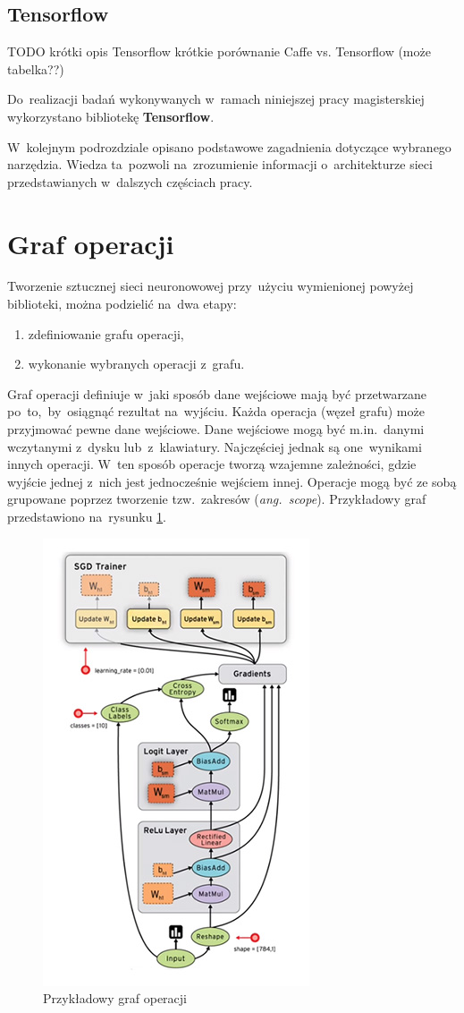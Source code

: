 \subsection{Tensorflow}
TODO krótki opis Tensorflow
krótkie porównanie Caffe vs. Tensorflow (może tabelka??)

Do~realizacji badań wykonywanych w~ramach niniejszej pracy magisterskiej wykorzystano bibliotekę
\textbf{Tensorflow}.

W~kolejnym podrozdziale opisano podstawowe zagadnienia dotyczące wybranego narzędzia. Wiedza ta~pozwoli na~zrozumienie
informacji o~architekturze sieci przedstawianych w~dalszych częściach pracy.

\section{Graf operacji}
Tworzenie sztucznej sieci neuronowowej przy~użyciu wymienionej powyżej biblioteki, można podzielić na~dwa etapy:
\begin{enumerate}
    \item zdefiniowanie grafu operacji,
    \item wykonanie wybranych operacji z~grafu.
\end{enumerate}

Graf operacji definiuje w~jaki sposób dane wejściowe mają być przetwarzane po~to,~by~osiągnąć rezultat na~wyjściu.
Każda operacja (węzeł grafu) może przyjmować pewne dane wejściowe. Dane wejściowe mogą być m.in.~danymi wczytanymi
z~dysku lub~z~klawiatury. Najczęściej jednak są one~wynikami innych operacji. W~ten sposób operacje tworzą wzajemne
zależności, gdzie wyjście jednej z~nich jest jednocześnie wejściem innej. Operacje mogą być ze sobą grupowane poprzez
tworzenie tzw.~zakresów (\textit{ang.~scope}). Przykładowy graf przedstawiono na~rysunku \ref{img:tf-smpl-grf}.

\begin{figure}[H]
	\centering
	\includegraphics[width=0.5\linewidth]{img/tf-sample-graph.jpg}
	\caption{Przykładowy graf operacji}
	\label{img:tf-smpl-grf}
\end{figure}

